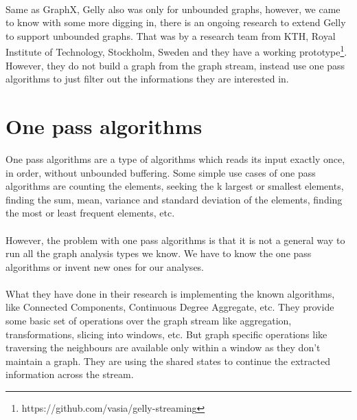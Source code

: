 \documentclass[12pt]{report}
\numberwithin{figure}{section}
\numberwithin{table}{section}
\begin{document}
\paragraph{}

Same as GraphX, Gelly also was only for unbounded graphs, however, we came to know with some more digging in, there is an ongoing research\cite{Kalavri} to extend Gelly to support unbounded graphs. That was by a research team from KTH, Royal Institute of Technology, Stockholm, Sweden and they have a working prototype\footnote{https://github.com/vasia/gelly-streaming}. However, they do not build a graph from the graph stream, instead use one pass algorithms to just filter out the informations they are interested in. 


\section{One pass algorithms}

One pass algorithms are a type of algorithms which reads its input exactly once, in order, without unbounded buffering. Some simple use cases of one pass algorithms are counting the elements, seeking the k largest or smallest elements, finding the sum, mean, variance and standard deviation of the elements, finding the most or least frequent elements, etc. 

\paragraph{}

However, the problem with one pass algorithms is that it is not a general way to run all the graph analysis types we know. We have to know the one pass algorithms or invent new ones for our analyses. 

\paragraph{}

What they have done in their research is implementing the known algorithms, like Connected Components, Continuous Degree Aggregate, etc. They provide some basic set of operations over the graph stream like aggregation, transformations, slicing into windows, etc. But graph specific operations like traversing the neighbours are available only within a window as they don’t maintain a graph. They are using the shared states to continue the extracted information across the stream.
\end{document}
